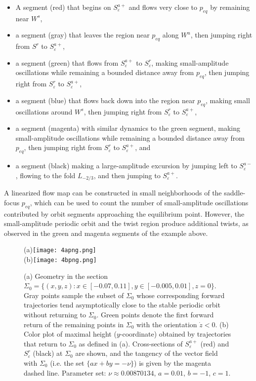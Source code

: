 \documentclass[aip, cha, sd, amsmath,amssymb, preprint]{revtex4-1}
\begin{document}
\begin{itemize}
\item A segment (red) that begins on $S^{a+}_{ \varepsilon}$ and flows very close to $p_{eq}$ by remaining near $W^s$,
\item a segment (gray) that leaves the region near $p_{eq}$ along $W^u$, then jumping right from $S^r$ to $S^{a+}_{ \varepsilon}$, 
\item a segment (green) that flows from $S^{a+}_{ \varepsilon}$ to $S^{r}_{ \varepsilon}$, making small-amplitude oscillations while remaining a bounded distance away from $p_{eq}$, then jumping right from $S^r_{ \varepsilon}$ to $S^{a+}_{ \varepsilon}$,
\item a segment (blue) that flows back down into the region near $p_{eq}$, making small oscillations around $W^s$, then jumping right from $S^r_{ \varepsilon}$ to $S^{a+}_{ \varepsilon}$,
\item a segment (magenta) with similar dynamics to the green segment, making small-amplitude oscillations while remaining a bounded distance away from $p_{eq}$, then jumping right from $S^r_{ \varepsilon}$ to $S^{a+}_{ \varepsilon}$, and
\item a segment (black) making a large-amplitude excursion by jumping left to $S^{a-}_{ \varepsilon}$, flowing to the fold $L_{-2/3}$, and then jumping to $S^{a+}_{ \varepsilon}$.
\end{itemize}

A linearized flow map can be constructed\cite{glendinning1984,silnikov1965} in small neighborhoods of the saddle-focus $p_{eq}$, which can be used to count the number of small-amplitude oscillations contributed by orbit segments approaching the equilibrium point. However, the small-amplitude periodic orbit and the twist region produce additional twists, as observed in the green and magenta segments of the example above. 

\begin{figure}
(a)\texttt{[image: 4apng.png]}\\
(b)\texttt{[image: 4bpng.png]}
\caption{\label{fig:z0} (a) Geometry in the section $\Sigma_0 = \{(x,y,z): x \in \left[-0.07,0.11\right], y \in \left[-0.005,0.01\right], z=0\}$.  Gray points sample the subset of $\Sigma_0$ whose corresponding forward trajectories tend asymptotically close to the stable periodic orbit without returning to $\Sigma_0$. Green points denote the first forward return of the remaining points in $\Sigma_0$ with the orientation $\dot{z} < 0$. (b) Color plot of maximal height ($y$-coordinate) obtained by trajectories that return to $\Sigma_0$ as defined in (a). Cross-sections of $S^{a+}_{ \varepsilon}$ (red) and $S^r_{ \varepsilon}$ (black) at $\Sigma_0$ are shown, and the tangency of the vector field with $\Sigma_0$ (i.e. the set $\{ax + by = -\nu\}$) is given by the magenta dashed line. Parameter set: $\nu \approx 0.00870134$, $a = 0.01$, $b = -1$, $c = 1$.}
\end{figure}
\end{document}

